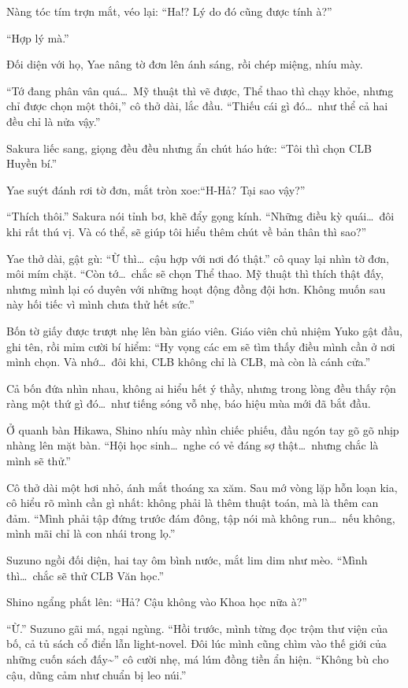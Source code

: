 \documentclass[../main.tex]{subfiles}
\begin{document}
Nàng tóc tím trợn mắt, véo lại: ``Ha!? Lý do đó cũng được tính à?''

``Hợp lý mà.''

Đối diện với họ, Yae nâng tờ đơn lên ánh sáng, rồi chép miệng, nhíu mày.

``Tớ đang phân vân quá\dots\ Mỹ thuật thì vẽ được, Thể thao thì chạy khỏe, nhưng chỉ được chọn một thôi,'' cô thở dài, lắc đầu. ``Thiếu cái gì đó\dots\ như thể cả hai đều chỉ là nửa vậy.''

Sakura liếc sang, giọng đều đều nhưng ẩn chút háo hức: ``Tôi thì chọn CLB Huyền bí.''

Yae suýt đánh rơi tờ đơn, mắt tròn xoe:``H-Hả? Tại sao vậy?''

``Thích thôi.'' Sakura nói tỉnh bơ, khẽ đẩy gọng kính. ``Những điều kỳ quái\dots\ đôi khi rất thú vị. Và có thể, sẽ giúp tôi hiểu thêm chút về bản thân thì sao?''

Yae thở dài, gật gù: ``Ừ thì\dots\ cậu hợp với nơi đó thật.'' cô quay lại nhìn tờ đơn, môi mím chặt. ``Còn tớ\dots\ chắc sẽ chọn Thể thao. Mỹ thuật thì thích thật đấy, nhưng mình lại có duyên với những hoạt động đồng đội hơn. Không muốn sau này hối tiếc vì mình chưa thử hết sức.''

Bốn tờ giấy được trượt nhẹ lên bàn giáo viên. Giáo viên chủ nhiệm Yuko gật đầu, ghi tên, rồi mỉm cười bí hiểm: ``Hy vọng các em sẽ tìm thấy điều mình cần ở nơi mình chọn. Và nhớ\dots\ đôi khi, CLB không chỉ là CLB, mà còn là cánh cửa.''

Cả bốn đứa nhìn nhau, không ai hiểu hết ý thầy, nhưng trong lòng đều thấy rộn ràng một thứ gì đó\dots\ như tiếng sóng vỗ nhẹ, báo hiệu mùa mới đã bắt đầu.

Ở quanh bàn Hikawa, Shino nhíu mày nhìn chiếc phiếu, đầu ngón tay gõ gõ nhịp nhàng lên mặt bàn. ``Hội học sinh\dots\ nghe có vẻ đáng sợ thật\dots\ nhưng chắc là mình sẽ thử.''

Cô thở dài một hơi nhỏ, ánh mắt thoáng xa xăm. Sau mớ vòng lặp hỗn loạn kia, cô hiểu rõ mình cần gì nhất: không phải là thêm thuật toán, mà là thêm can đảm. ``Mình phải tập đứng trước đám đông, tập nói mà không run\dots\ nếu không, mình mãi chỉ là con nhái trong lọ.''

Suzuno ngồi đối diện, hai tay ôm bình nước, mắt lim dim như mèo. ``Mình thì\dots\ chắc sẽ thử CLB Văn học.''

Shino ngẩng phắt lên: ``Hả? Cậu không vào Khoa học nữa à?''

``Ừ.'' Suzuno gãi má, ngại ngùng. ``Hồi trước, mình từng đọc trộm thư viện của bố, cả tủ sách cổ điển lẫn light-novel. Đôi lúc mình cũng chìm vào thế giới của những cuốn sách đấy\~{}'' cô cười nhẹ, má lúm đồng tiền ẩn hiện. ``Không bù cho cậu, dũng cảm như chuẩn bị leo núi.''
\end{document}
